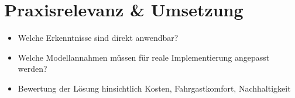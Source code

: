\section{Praxisrelevanz \& Umsetzung}
\begin{itemize}
    \item Welche Erkenntnisse sind direkt anwendbar?
    \item Welche Modellannahmen müssen für reale Implementierung angepasst werden?
    \item Bewertung der Lösung hinsichtlich Kosten, Fahrgastkomfort, Nachhaltigkeit
\end{itemize}
